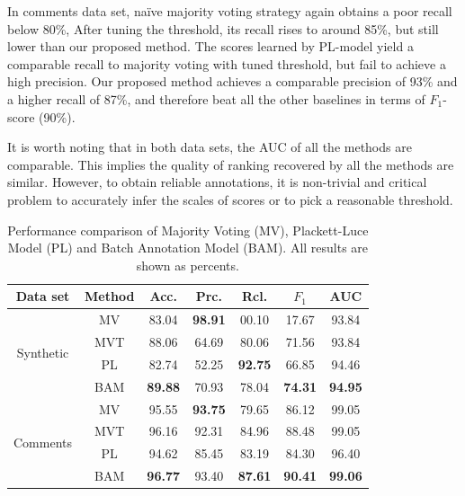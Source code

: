 In comments data set, na\"{i}ve majority voting strategy again obtains a poor recall below 80\%, 
After tuning the threshold, its recall rises to around 85\%, but still lower than our proposed method.  
The scores learned by PL-model yield a comparable recall to majority voting with tuned threshold, 
but fail to achieve a high precision.  
Our proposed method achieves a comparable precision of 93\% and a higher recall of 87\%, 
and therefore beat all the other baselines in terms of $F_1$-score (90\%).  


It is worth noting that in both data sets, the AUC of all the methods are comparable.  
This implies the quality of ranking recovered by all the methods are similar.  
However, to obtain reliable annotations, it is non-trivial and critical problem to accurately infer the scales of scores 
or to pick a reasonable threshold.  



\begin{table}[!t]
\centering
 {\caption{Performance comparison of Majority Voting (MV), Plackett-Luce Model (PL) and Batch Annotation Model (BAM).  
 All results are shown as percents.}\label{tab:performance}}
{

  \begin{tabular}{@{}c@{}|@{}c@{}||c|c|c|c|c@{}}
    \hline
        Data set & Method    & Acc.           & Prc.           & Rcl.           & $F_1$          & AUC \\ \hline \hline
        \multirow{4}{*}{Synthetic}
                 & MV        & 83.04          & \textbf{98.91} & 00.10          & 17.67          & 93.84          \\ \cline{2-7}
                 & MVT       & 88.06          & 64.69          & 80.06          & 71.56          & 93.84          \\ \cline{2-7}
                 & PL        & 82.74          & 52.25          & \textbf{92.75} & 66.85          & 94.46          \\ \cline{2-7}
                 & BAM       & \textbf{89.88} & 70.93          & 78.04          & \textbf{74.31} & \textbf{94.95} \\ \hline
        \multirow{4}{*}{Comments}
                 & MV        & 95.55          & \textbf{93.75} & 79.65          & 86.12          & 99.05          \\ \cline{2-7}
                 & MVT       & 96.16          & 92.31          & 84.96          & 88.48          & 99.05          \\ \cline{2-7}
                 & PL        & 94.62          & 85.45          & 83.19          & 84.30          & 96.40          \\ \cline{2-7}
                 & BAM       & \textbf{96.77} & 93.40          & \textbf{87.61} & \textbf{90.41} & \textbf{99.06} \\ \hline
  \end{tabular}
}
\end{table}





